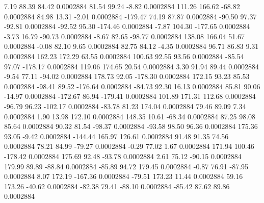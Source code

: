         7.19       88.39       84.42     0.0002884
       81.54       99.24       -8.82     0.0002884
      111.26      166.62      -68.82     0.0002884
       84.98       13.31       -2.01     0.0002884
     -179.47       74.19       87.87     0.0002884
      -90.50       97.37      -92.81     0.0002884
      -92.52       95.30     -174.46     0.0002884
       -7.87      104.30     -177.65     0.0002884
       -3.73       16.79      -90.73     0.0002884
       -8.67       82.65      -98.77     0.0002884
      138.08      166.04       51.67     0.0002884
       -0.08       82.10        9.65     0.0002884
       82.75       84.12       -4.35     0.0002884
       96.71       86.83        9.31     0.0002884
      162.23      172.29       63.55     0.0002884
      100.63       92.55       93.56     0.0002884
      -85.54       97.07     -178.17     0.0002884
      119.06      174.65       20.54     0.0002884
        3.30       91.94       89.44     0.0002884
       -9.54       77.11      -94.02     0.0002884
      178.73       92.05     -178.30     0.0002884
      172.15       93.23       85.53     0.0002884
      -98.41       89.52     -176.64     0.0002884
      -84.73       92.30       16.13     0.0002884
       85.81       90.06      -14.97     0.0002884
     -172.67       86.94     -179.41     0.0002884
      101.89      171.31      112.68     0.0002884
      -96.79       96.23     -102.17     0.0002884
      -83.78       81.23      174.04     0.0002884
       79.46       89.09        7.34     0.0002884
        1.90       13.98      172.10     0.0002884
      148.35       10.61      -68.34     0.0002884
       87.25       98.08       85.64     0.0002884
       90.32       81.54      -98.37     0.0002884
      -93.58       98.50       96.36     0.0002884
      175.36       93.05       -9.42     0.0002884
     -144.44      165.97      126.61     0.0002884
       91.48       91.35       74.56     0.0002884
       78.21       84.99      -79.27     0.0002884
       -0.29       77.02        1.67     0.0002884
      171.94      100.46     -178.42     0.0002884
      175.69       92.48      -93.78     0.0002884
        2.61       75.12      -90.15     0.0002884
      179.99       89.89      -88.84     0.0002884
      -85.89       94.72      179.45     0.0002884
       -0.87       76.91      -87.95     0.0002884
        8.07      172.19     -167.36     0.0002884
      -79.51      173.23       11.44     0.0002884
       59.16      173.26      -40.62     0.0002884
      -82.38       79.41      -88.10     0.0002884
      -85.42       87.62       89.86     0.0002884
